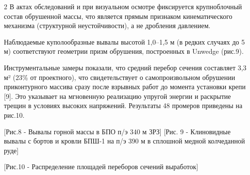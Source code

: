 \begin{multicols}{2}
В актах обследований и при визуальном осмотре фиксируется
крупноблочный состав обрушенной массы, что является прямым признаком
кинематического механизма (структурной неустойчивости), а не дробления
давлением.

Наблюдаемые куполообразные вывалы высотой 1,0--1,5 м (в редких случаях
до 5 м) соответствуют геометрии призм обрушения, построенных в Unwedge
(рис.9).

Инструментальные замеры показали, что средний перебор сечения составляет
3,3 м² (23\% от проектного), что свидетельствует о самопроизвольном
обрушении приконтурного массива сразу после взрывных работ до момента
установки крепи {[}9{]}. Это указывает на мгновенную реализацию упругой
энергии и раскрытие трещин в условиях высоких напряжений. Результаты 48
промеров приведены на рис.10.
\end{multicols}

\begin{figs}
    [Рис.8 - Вывалы горной массы в БПО п/э 340 м ЗРЗ]
    [Рис. 9 - Клиновидные вывалы с бортов и кровли БПШ-1 на п/э 390 м в сплошной
медной колчеданной руде]
\end{figs}

[Рис.10 - Распределение площадей переборов сечений выработок]

